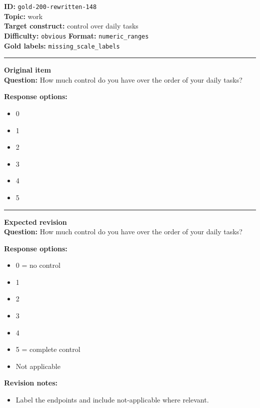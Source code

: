 \documentclass[10pt,a4paper]{article}
\newcommand{\sectionline}{\vspace{0.15em}\hrule\vspace{0.35em}}
\begin{document}
\begin{tcolorbox}[colframe=FlawRed,colback=white,colbacktitle=FlawRed!9,coltitle=black,title={Item 148\hfill Flawed item}]
\textbf{ID:} \texttt{gold-200-rewritten-148}\\
\textbf{Topic:} work\\
\textbf{Target construct:} control over daily tasks\\
\textbf{Difficulty:} \texttt{obvious} \quad \textbf{Format:} \texttt{numeric\_ranges}\\
\textbf{Gold labels:} \texttt{missing\_scale\_labels}\\
\sectionline
\textbf{Original item}\\
\textbf{Question:} How much control do you have over the order of your daily tasks?
\par\textbf{Response options:}
\begin{itemize}
\item 0
\item 1
\item 2
\item 3
\item 4
\item 5
\end{itemize}
\sectionline
\textbf{Expected revision}\\
\textbf{Question:} How much control do you have over the order of your daily tasks?
\par\textbf{Response options:}
\begin{itemize}
\item 0 = no control
\item 1
\item 2
\item 3
\item 4
\item 5 = complete control
\item Not applicable
\end{itemize}
\par\textbf{Revision notes:}
\begin{itemize}
\item Label the endpoints and include not-applicable where relevant.
\end{itemize}
\end{tcolorbox}
\end{document}
